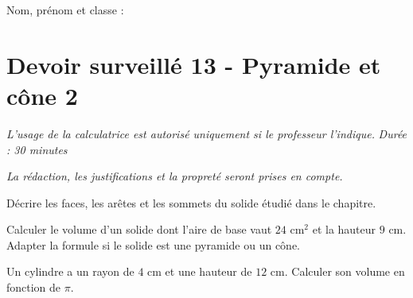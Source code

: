 \documentclass[a4paper,10pt]{report}
\begin{document}
\pagestyle{empty}
\noindent Nom, prénom et classe : \dotfill

\section*{Devoir surveillé 13 - Pyramide et cône 2}

\noindent \textit{L'usage de la calculatrice est autorisé uniquement si le professeur l'indique.} \hfill \textit{Durée : 30 minutes}

\medskip
\noindent \textit{La rédaction, les justifications et la propreté seront prises en compte.}


\begin{ex}[Vocabulaire]
Décrire les faces, les arêtes et les sommets du solide étudié dans le chapitre.
\medskip\noindent\grandscarreaux{\linewidth}{3cm}
\end{ex}
\begin{ex}[Volume]
Calculer le volume d'un solide dont l'aire de base vaut $24$ cm$^2$ et la hauteur $9$ cm. Adapter la formule si le solide est une pyramide ou un cône.
\medskip\noindent\grandscarreaux{\linewidth}{4cm}
\end{ex}
\begin{ex}[Problème]
Un cylindre a un rayon de $4$ cm et une hauteur de $12$ cm. Calculer son volume en fonction de $\pi$.
\medskip\noindent\grandscarreaux{\linewidth}{4cm}
\end{ex}
\end{document}
